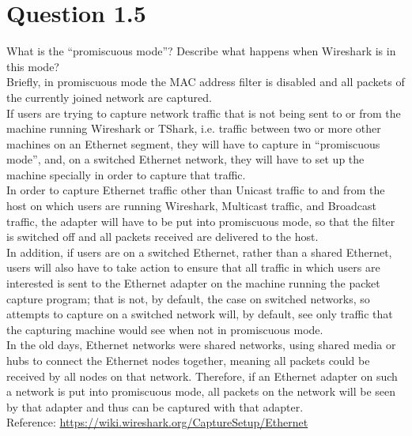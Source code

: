 \documentclass{article}
\newenvironment{homeworkProblem}[1]{
	\section*{#1}
	}{
}
\begin{document}
\begin{homeworkProblem}{Question 1.5}
What is the ``promiscuous mode''? Describe what happens when Wireshark is in this mode?\\

Briefly, in promiscuous mode the MAC address filter is disabled and all packets of the currently joined network are captured.\\

If users are trying to capture network traffic that is not being sent to or from the machine running Wireshark or TShark, i.e. traffic between two or more other machines on an Ethernet segment, they will have to capture in ``promiscuous mode'', and, on a switched Ethernet network, they will have to set up the machine specially in order to capture that traffic.\\

In order to capture Ethernet traffic other than Unicast traffic to and from the host on which users are running Wireshark, Multicast traffic, and Broadcast traffic, the adapter will have to be put into promiscuous mode, so that the filter is switched off and all packets received are delivered to the host.\\

In addition, if users are on a switched Ethernet, rather than a shared Ethernet, users will also have to take action to ensure that all traffic in which users are interested is sent to the Ethernet adapter on the machine running the packet capture program; that is not, by default, the case on switched networks, so attempts to capture on a switched network will, by default, see only traffic that the capturing machine would see when not in promiscuous mode.\\

In the old days, Ethernet networks were shared networks, using shared media or hubs to connect the Ethernet nodes together, meaning all packets could be received by all nodes on that network. Therefore, if an Ethernet adapter on such a network is put into promiscuous mode, all packets on the network will be seen by that adapter and thus can be captured with that adapter.\\

Reference: \url{https://wiki.wireshark.org/CaptureSetup/Ethernet}
\end{homeworkProblem}

\end{document}
